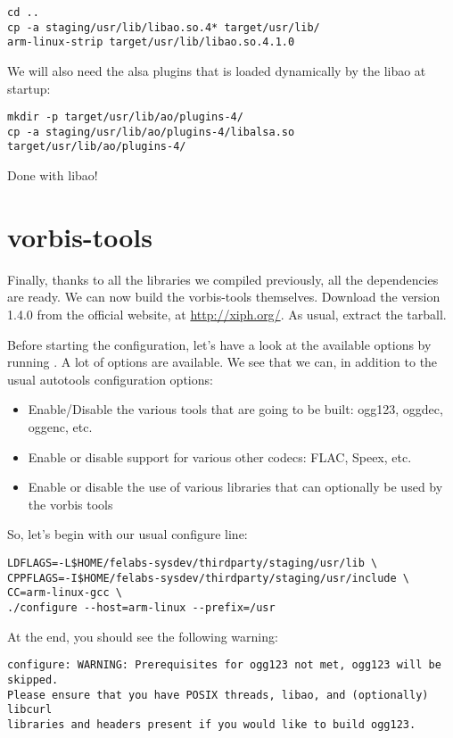 \begin{verbatim}
cd ..
cp -a staging/usr/lib/libao.so.4* target/usr/lib/
arm-linux-strip target/usr/lib/libao.so.4.1.0
\end{verbatim}

We will also need the alsa plugins that is loaded dynamically by the
libao at startup:
\begin{verbatim}
mkdir -p target/usr/lib/ao/plugins-4/
cp -a staging/usr/lib/ao/plugins-4/libalsa.so target/usr/lib/ao/plugins-4/
\end{verbatim}

Done with libao!

\section{vorbis-tools}

Finally, thanks to all the libraries we compiled previously, all the
dependencies are ready. We can now build the vorbis-tools themselves.
Download the version 1.4.0 from the official website, at
\url{http://xiph.org/}. As usual, extract the tarball.

Before starting the configuration, let's have a look at the available
options by running . A lot of options are
available. We see that we can, in addition to the usual autotools
configuration options:

\begin{itemize}
\item Enable/Disable the various tools that are going to be built:
  ogg123, oggdec, oggenc, etc.
\item Enable or disable support for various other codecs: FLAC, Speex,
  etc.
\item Enable or disable the use of various libraries that can
  optionally be used by the vorbis tools
\end{itemize}

So, let's begin with our usual configure line:

\begin{verbatim}
LDFLAGS=-L$HOME/felabs-sysdev/thirdparty/staging/usr/lib \
CPPFLAGS=-I$HOME/felabs-sysdev/thirdparty/staging/usr/include \
CC=arm-linux-gcc \
./configure --host=arm-linux --prefix=/usr
\end{verbatim}

At the end, you should see the following warning:

\begin{verbatim}
configure: WARNING: Prerequisites for ogg123 not met, ogg123 will be skipped.
Please ensure that you have POSIX threads, libao, and (optionally) libcurl
libraries and headers present if you would like to build ogg123.
\end{verbatim}

